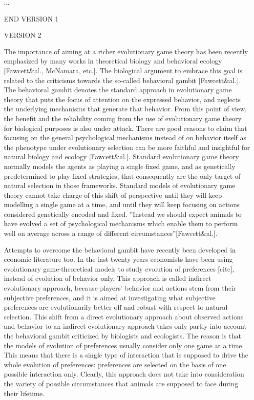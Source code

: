 \documentclass[fleqn,reqno,11pt]{article}
\begin{document}
...

END VERSION 1





VERSION 2

The importance of aiming at a richer evolutionary game theory has been recently emphasized by many works in theoretical biology and behavioral ecology [Fawcett\&al., McNamara, etc.]. The biological argument to embrace this goal is related to the criticisms towards the so-called behavioral gambit [Fawcett\&al.]. The behavioral gambit denotes the standard approach in evolutionary game theory that puts the focus of attention on the expressed behavior, and neglects the underlying mechanisms that generate that behavior. From this point of view, the benefit and the reliability coming from the use of evolutionary game theory for biological purposes is also under attack. There are good reasons to claim that focusing on the general psychological mechanisms instead of on behavior itself as the phenotype under evolutionary selection can be more faithful and insightful for natural biology and ecology [Fawcett\&al.].
Standard evolutionary game theory normally models the agents as playing a single fixed game, and as genetically predetermined to play fixed strategies, that consequently are the only target of natural selection in those frameworks. Standard models of evolutionary game theory cannot take charge of this shift of perspective until they will keep modelling a single game at a time, and until they will keep focusing on actions considered genetically encoded and fixed. ''Instead we should expect animals to have evolved a set of psychological mechanisms which enable them to perform well on average across a range of different circumstances''[Fawcett\&al.].

Attempts to overcome the behavioral gambit have recently been developed in economic literature too. In the last twenty years economists have been using evolutionary game-theoretical models to study evolution of preferences [cite], instead of evolution of behavior only. This approach is called indirect evolutionary approach, because players' behavior and actions stem from their subjective preferences, and it is aimed at investigating what subjective preferences are evolutionarily better off and robust with respect to natural selection. This shift from a direct evolutionary approach about observed actions and behavior to an indirect evolutionary approach takes only partly into account the behavioral gambit criticized by biologists and ecologists. The reason is that the models of evolution of preferences usually consider only one game at a time. This means that there is a single type of interaction that is supposed to drive the whole evolution of preferences: preferences are selected on the basis of one possible interaction only. Clearly, this approach does not take into consideration the variety of possible circumstances that animals are supposed to face during their lifetime. 
\end{document}
